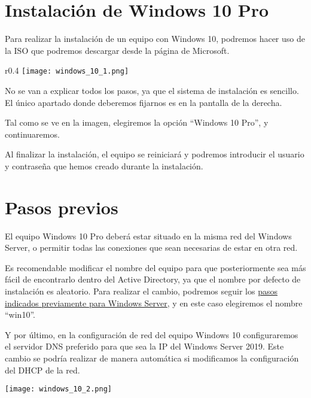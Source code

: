 \section{Instalación de Windows 10 Pro}
Para realizar la instalación de un equipo con Windows 10, podremos hacer uso de la ISO que podremos descargar desde la página de Microsoft.

\begin{wrapfigure}{r}{0.4\linewidth}
    \centering
    \vspace{-10pt}
    \texttt{[image: windows\_10\_1.png]}
    \vspace{-40pt}
\end{wrapfigure}


No se van a explicar todos los pasos, ya que el sistema de instalación es sencillo. El único apartado donde deberemos fijarnos es en la pantalla de la derecha.

Tal como se ve en la imagen, elegiremos la opción “Windows 10 Pro”, y continuaremos.

Al finalizar la instalación, el equipo se reiniciará y podremos introducir el usuario y contraseña que hemos creado durante la instalación.


\section{Pasos previos}
El equipo Windows 10 Pro deberá estar situado en la misma red del Windows Server, o permitir todas las conexiones que sean necesarias de estar en otra red.

Es recomendable modificar el nombre del equipo para que posteriormente sea más fácil de encontrarlo dentro del Active Directory, ya que el nombre por defecto de instalación es aleatorio. Para realizar el cambio, podremos seguir los \hyperlink{cambiar_nombre_equipo}{pasos indicados previamente para Windows Server}, y en este caso elegiremos el nombre “win10”.

Y por último, en la configuración de red del equipo Windows 10 configuraremos el servidor DNS preferido para que sea la IP del Windows Server 2019. Este cambio se podría realizar de manera automática si modificamos la configuración del DHCP de la red.

\begin{center}
    \texttt{[image: windows\_10\_2.png]}
\end{center}

